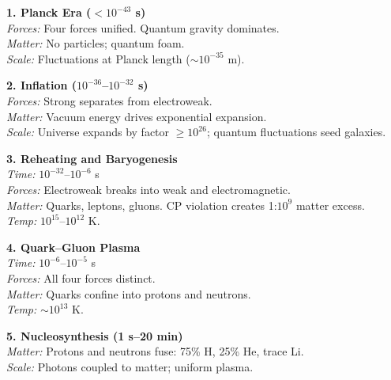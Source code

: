 \begin{center}
\begin{tcolorbox}[
  enhanced,
  breakable,
  width=\textwidth,
  colframe=blue!60!black,
  colback=blue!5,
  colbacktitle=blue!60!black,
  coltitle=white,
  boxrule=0.5pt,
  arc=2mm,
  left=10pt,
  right=10pt,
  top=10pt,
  bottom=10pt,
  title=$\Lambda$CDM Cosmology Timeline,
  fonttitle=\bfseries\large,
  attach boxed title to top left={yshift=-2mm, xshift=5mm},
  boxed title style={arc=1mm, boxrule=0.5pt}
]

\begin{multicols}{2}
\raggedright
\footnotesize
\setlength{\parskip}{3pt}

{\bfseries 1. Planck Era ($<10^{-43}$ s)}\\
\textit{Forces:} Four forces unified. Quantum gravity dominates.\\
\textit{Matter:} No particles; quantum foam.\\
\textit{Scale:} Fluctuations at Planck length ($\sim10^{-35}$ m).

{\bfseries 2. Inflation ($10^{-36}$–$10^{-32}$ s)}\\
\textit{Forces:} Strong separates from electroweak.\\
\textit{Matter:} Vacuum energy drives exponential expansion.\\
\textit{Scale:} Universe expands by factor $\geq10^{26}$; quantum fluctuations seed galaxies.

{\bfseries 3. Reheating and Baryogenesis}\\
\textit{Time:} $10^{-32}$–$10^{-6}$ s\\
\textit{Forces:} Electroweak breaks into weak and electromagnetic.\\
\textit{Matter:} Quarks, leptons, gluons. CP violation creates 1:$10^9$ matter excess.\\
\textit{Temp:} $10^{15}$–$10^{12}$ K.

{\bfseries 4. Quark–Gluon Plasma}\\
\textit{Time:} $10^{-6}$–$10^{-5}$ s\\
\textit{Forces:} All four forces distinct.\\
\textit{Matter:} Quarks confine into protons and neutrons.\\
\textit{Temp:} $\sim10^{13}$ K.

{\bfseries 5. Nucleosynthesis (1 s–20 min)}\\
\textit{Matter:} Protons and neutrons fuse: 75\% H, 25\% He, trace Li.\\
\textit{Scale:} Photons coupled to matter; uniform plasma.


\end{multicols}
\end{tcolorbox}
\end{center}
